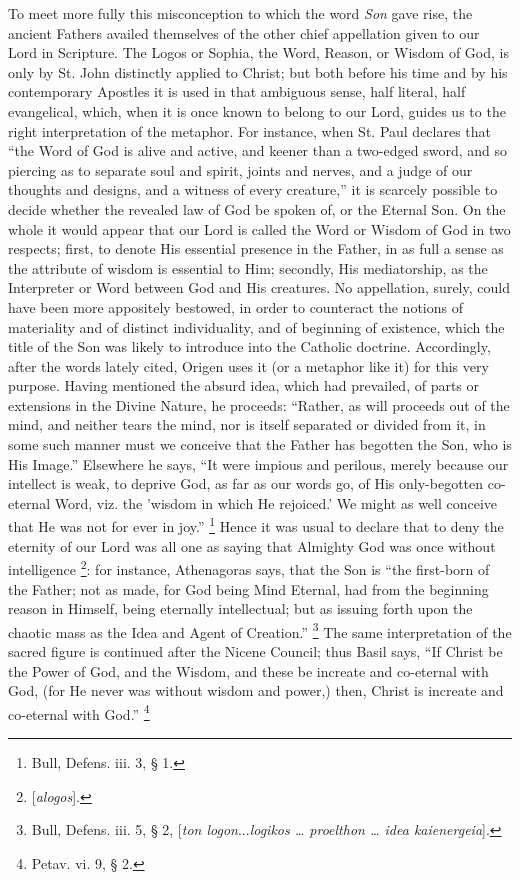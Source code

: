 To meet more fully this misconception to which the word \emph{Son}
gave rise, the ancient Fathers availed themselves of the other chief
appellation given to our Lord in Scripture. The Logos or Sophia, the
Word, Reason, or Wisdom of God, is only by St. John distinctly applied
to Christ; but both before his time and by his contemporary Apostles
it is used in that ambiguous sense, half literal, half evangelical,
which, when it is once known to belong to our Lord, guides us to the
right interpretation of the metaphor. For instance, when St. Paul
declares that ``the Word of God is alive and active, and keener
than a two-edged sword, and so piercing as to separate soul and
spirit, joints and nerves, and a judge of our thoughts and designs,
and a witness of every creature,'' it is scarcely possible to
decide whether the revealed law of God be spoken of, or the Eternal
Son. On the whole it would appear that our Lord is called the Word or
Wisdom of God in two respects; first, to denote His essential presence
in the Father, in as full a sense as the attribute of wisdom is
essential to Him; secondly, His mediatorship, as the Interpreter or
Word between God and His creatures. No appellation, surely, could have
been more appositely bestowed, in order to counteract the notions of
materiality and of distinct individuality, and of beginning of
existence, which the title of the Son was likely to introduce into the
Catholic doctrine. Accordingly, after the words lately cited,
Origen uses it (or a metaphor like it) for this very purpose. Having
mentioned the absurd idea, which had prevailed, of parts or extensions
in the Divine Nature, he proceeds: ``Rather, as will proceeds out
of the mind, and neither tears the mind, nor is itself separated or
divided from it, in some such manner must we conceive that the Father
has begotten the Son, who is His Image.'' Elsewhere he says,
``It were impious and perilous, merely because our intellect is
weak, to deprive God, as far as our words go, of His only-begotten
co-eternal Word, viz. the 'wisdom in which He rejoiced.' We might as
well conceive that He was not for ever in joy.'' \footnote{Bull, Defens. iii. 3, § 1.} Hence it was usual to declare that to deny the eternity of our
Lord was all one as saying that Almighty God was once without
intelligence \footnote{[\emph{alogos}].}: for
instance, Athenagoras says, that the Son is ``the first-born of
the Father; not as made, for God being Mind Eternal, had from the
beginning reason in Himself, being eternally intellectual; but as
issuing forth upon the chaotic mass as the Idea and Agent of
Creation.'' \footnote{Bull, Defens. iii. 5, § 2, [\emph{ton logon}...\emph{logikos … proelthon … idea kai}\emph{energeia}].} The
same interpretation of the sacred figure is continued after the Nicene
Council; thus Basil says, ``If Christ be the Power of God, and the
Wisdom, and these be increate and co-eternal with God, (for He never
was without wisdom and power,) then, Christ is increate and co-eternal
with God.'' \footnote{Petav. vi. 9, § 2.}

